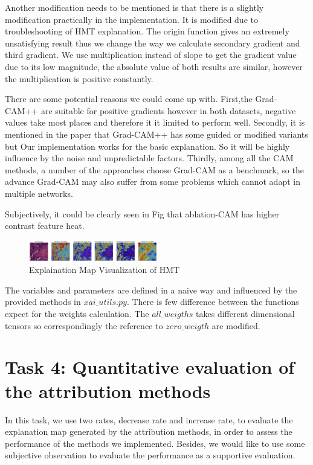 \documentclass[conference]{IEEEtran}
\begin{document}
Another modification needs to be mentioned is that there is a slightly modification practically in the implementation. It is modified due to troubleshooting of HMT explanation. The origin function gives an extremely unsatisfying result thus we change the way we calculate secondary gradient and third gradient. We use multiplication instead of slope to get the gradient value due to its low magnitude, the absolute value of both results are similar, however the multiplication is positive constantly.\par
There are some potential reasons we could come up with. First,the Grad-CAM++ are suitable for positive gradients however in both datasets, negative values take most places and therefore it it limited to perform well. Secondly, it is mentioned in the paper that Grad-CAM++ has some guided or modified variants but Our implementation works for the basic explanation. So it will be highly influence by the noise and unpredictable factors. Thirdly, among all the CAM methods, a number of the approaches choose Grad-CAM as a benchmark, so the advance Grad-CAM may also suffer from some problems which cannot adapt in multiple networks.\par
Subjectively, it could be clearly seen in Fig that ablation-CAM has higher contrast feature heat.

\begin{figure}[h] 
    \centering
    \includegraphics[width=0.5\textwidth]{./graphs/plot.png}
    \caption{Explaination Map Visualization of HMT} 
\end{figure}


The variables and parameters are defined in a naive way and influenced by the provided methods in $xai\_utils.py$. There is few difference between the functions expect for the weights calculation. The $all\_weigths$ takes different dimensional tensors so correspondingly the reference to $zero\_weigth$ are modified.

\section{Task 4: Quantitative evaluation of the attribution methods}

In this task, we use two rates, decrease rate and increase rate, to evaluate the explanation map generated by the attribution methods, in order to assess the performance of the methods we implemented. Besides, we would like to use some subjective observation to evaluate the performance as a supportive evaluation.
\end{document}
